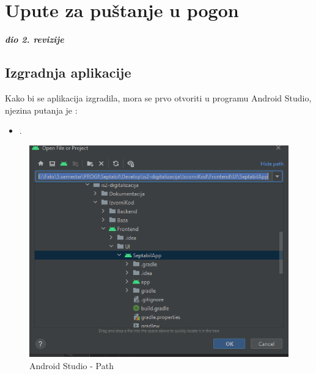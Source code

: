 	\eject
		
		\section{Upute za puštanje u pogon}
		
			\textbf{\textit{dio 2. revizije}}\\
		
		
			 
			 \subsection{Izgradnja aplikacije} 
			 
			 Kako bi se aplikacija izgradila, mora se prvo otvoriti u programu Android Studio, njezina putanja je :
			 \begin{itemize}
			 	\item  {}.
			 \end{itemize}
			 
			\begin{figure}[H]
				\centering
				\includegraphics[scale=0.55]{./slike/astudio1.png}
				\caption{Android Studio - Path}
				\label{fig:astudio1}
			\end{figure}
		

